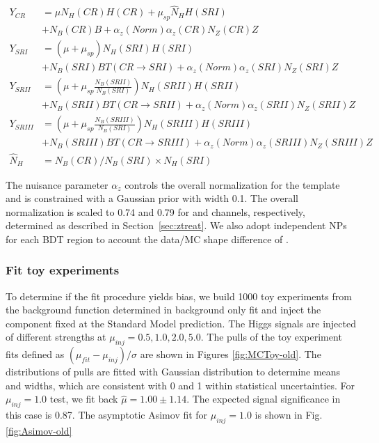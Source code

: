 \begin{equation}
\label{yield-old}
\begin{split}
Y_{CR} &= \mu N_{H}(CR)H(CR)+  \mu_{sp}\hat{N}_{H}H(SRI) \\
       &+ N_{B}(CR)B+ \alpha_{z}(Norm)\alpha_{z}(CR)N_{Z}(CR)Z  \\
Y_{SRI} &= (\mu+\mu_{sp})N_{H}(SRI)H(SRI) \\
        &+ N_{B}(SRI)BT(CR\rightarrow SRI) + \alpha_{z}(Norm)\alpha_{z}(SRI)N_{Z}(SRI)Z\\
Y_{SRII} &= (\mu+\mu_{sp}\frac{N_{B}(SRII)}{N_{B}(SRI)})N_{H}(SRII)H(SRII) \\
         & + N_{B}(SRII)BT(CR\rightarrow SRII) + \alpha_{z}(Norm)\alpha_{z}(SRII)N_{Z}(SRII)Z \\
Y_{SRIII} &= (\mu+\mu_{sp}\frac{N_{B}(SRIII)}{N_{B}(SRI)})N_{H}(SRIII)H(SRIII) \\
          & + N_{B}(SRIII)BT(CR\rightarrow SRIII) + \alpha_{z}(Norm)\alpha_{z}(SRIII)N_{Z}(SRIII)Z\\
\hat{N}_H &= N_B(CR)/N_B(SRI)\times N_{H}(SRI)
\end{split}
\end{equation}

The nuisance parameter $\alpha_{z}$ controls the overall normalization for the \zjets{} template 
and is constrained with a Gaussian prior with width 0.1. The overall normalization is scaled to 0.74 and 0.79 for \twocentral and \fourcentral channels, respectively, determined as described in Section~\ref{sec:ztreat}.
We also adopt independent NPs for each BDT region to account the data/MC shape difference of \zjets{}. 


\subsubsection{Fit toy experiments}

To determine if the fit procedure yields bias, we build 1000 toy experiments from the background function determined in background only fit and inject the \Zjets{} component fixed at the Standard Model prediction. The Higgs signals are injected of different strengths at $\mu_{inj} = 0.5, 1.0, 2.0, 5.0$. The pulls of the toy experiment fits defined as $(\mu_{fit}-\mu_{inj})/ \sigma$ are shown in Figures \ref{fig:MCToy-old}. The distributions of pulls are fitted with Gaussian distribution to determine means and widths, which are consistent with 0 and 1 within statistical uncertainties. For $\mu_{inj}=1.0$ test, we fit back $\hat{\mu}=1.00\pm 1.14$. The expected signal significance in this case is 0.87. The asymptotic Asimov fit for $\mu_{inj}=1.0$ is shown in Fig. \ref{fig:Asimov-old}


